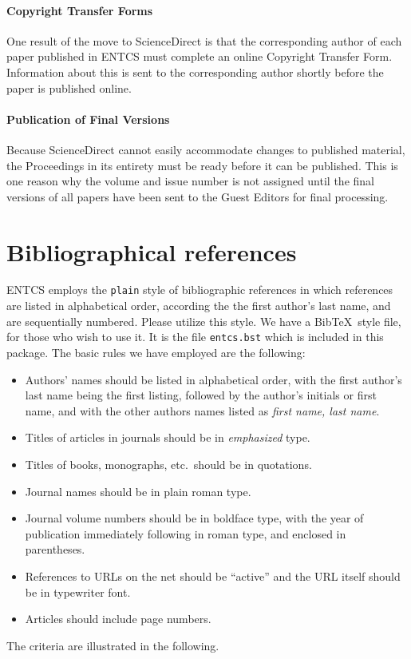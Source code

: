 \documentclass{entcs} \usepackage{entcsmacro}
\begin{document}
\paragraph{Copyright Transfer Forms}
One result of the move to ScienceDirect is that the corresponding
author of each paper published in ENTCS must complete an online Copyright
Transfer Form. Information about this is sent to the corresponding author shortly
before the paper is published online. 

\paragraph{Publication of Final Versions}
Because ScienceDirect cannot easily accommodate changes to published
material, the Proceedings in its entirety must be ready before it can
be published. This is one reason why the volume and issue number is
not assigned until the final versions of all papers have been sent to
the Guest Editors for final processing. 

\section{Bibliographical references}\label{references}
ENTCS employs the \texttt{plain} style of bibliographic references in
which references are listed in alphabetical order, according the the
first author's last name, and are sequentially numbered. Please
utilize this style. We have a Bib\TeX\ style file, for those who wish
to use it. It is the file \texttt{entcs.bst} which is included in this
package. The basic rules we have employed are the following:
\begin{itemize}
\item Authors' names should be listed in alphabetical order, with the
  first author's last name being the first listing, followed by the
  author's initials or first name, and with the other authors names
  listed as \emph{first name, last name}.
\item Titles of articles in journals should be in \emph{emphasized}
  type.
\item Titles of books, monographs, etc.\ should be in quotations.
\item Journal names should be in plain roman type.
\item Journal volume numbers should be in boldface type, with the year
  of publication immediately following in roman type, and enclosed in
  parentheses.
\item References to URLs on the net should be ``active'' and the URL
  itself should be in typewriter font.
\item Articles should include page numbers.
\end{itemize}
The criteria are illustrated in the following.
\end{document}
